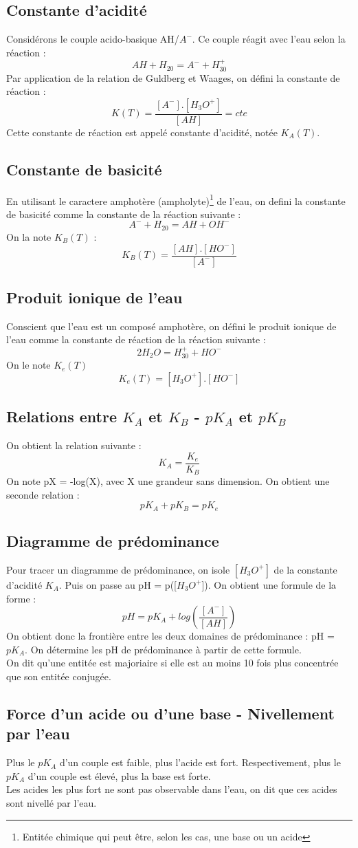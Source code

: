 \subsection{Constante d'acidité}
Considérons le couple acido-basique AH/$A^-$. Ce couple réagit avec l'eau selon la réaction :
$$AH + H_20 = A^- + H_30^+$$
Par application de la relation de Guldberg et Waages, on défini la constante de réaction :
$$K(T) = \dfrac{[A^-].[H_3O^+]}{[AH]} = cte$$
Cette constante de réaction est appelé constante d'acidité, notée $K_A(T)$.
\subsection{Constante de basicité}
En utilisant le caractere amphotère (ampholyte)\footnote{Entitée chimique qui peut être, selon les cas, une base ou un acide} de l'eau, on defini la constante de basicité comme la constante de la réaction suivante :
$$A^- + H_20 = AH + OH^-$$
On la note $K_B(T)$ :
$$K_B(T) = \dfrac{[AH].[HO^-]}{[A^-]}$$
\subsection{Produit ionique de l'eau}
Conscient que l'eau est un composé amphotère, on défini le produit ionique de l'eau comme la constante de réaction de la réaction suivante :
$$2H_2O = H_30^+ + HO^-$$
On le note $K_e(T)$
$$K_e(T) = [H_3O^+].[HO^-]$$
\subsection{Relations entre $K_A$ et $K_B$ - $pK_A$ et $pK_B$}
On obtient la relation suivante :
$$K_A=\dfrac{K_e}{K_B}$$
On note pX = -log(X), avec X une grandeur sans dimension. On obtient une seconde relation :
$$pK_A + pK_B = pK_e$$
\subsection{Diagramme de prédominance}
Pour tracer un diagramme de prédominance, on isole $[H_3O^+]$ de la constante d'acidité $K_A$. Puis on passe au pH = p([$H_3O^+$]). On obtient une formule de la forme :
$$pH = pK_A + log\left( \dfrac{[A^-]}{[AH]}\right) $$
On obtient donc la frontière entre les deux domaines de prédominance : pH = $pK_A$. On détermine les pH de prédominance à partir de cette formule.\\
On dit qu'une entitée est majoriaire si elle est au moins 10 fois plus concentrée que son entitée conjugée.
\subsection{Force d'un acide ou d'une base - Nivellement par l'eau}
Plus le $pK_A$ d'un couple est faible, plus l'acide est fort. Respectivement, plus le $pK_A$ d'un couple est élevé, plus la base est forte.\\
Les acides les plus fort ne sont pas observable dans l'eau, on dit que ces acides sont nivellé par l'eau.
